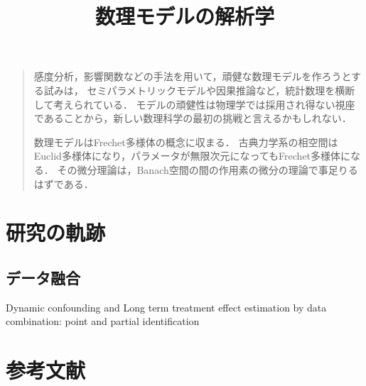 \documentclass[uplatex,dvipdfmx]{jsreport}
\title{数理モデルの解析学}
\author{}
\begin{document}
\tableofcontents

\begin{quotation}
    感度分析，影響関数などの手法を用いて，頑健な数理モデルを作ろうとする試みは，
    セミパラメトリックモデルや因果推論など，統計数理を横断して考えられている．
    モデルの頑健性は物理学では採用され得ない視座であることから，新しい数理科学の最初の挑戦と言えるかもしれない．
    
    数理モデルはFrechet多様体の概念に収まる．
    古典力学系の相空間はEuclid多様体になり，パラメータが無限次元になってもFrechet多様体になる．
    その微分理論は，Banach空間の間の作用素の微分の理論で事足りるはずである．
\end{quotation}

\chapter{研究の軌跡}

\section{データ融合}

\begin{thebibliography}{9}
    \bibitem{}
    Dynamic confounding and Long term treatment effect estimation by data combination: point and partial identification
\end{thebibliography}



\chapter{参考文献}

\begin{thebibliography}{99}
    
\end{thebibliography}
\end{document}
